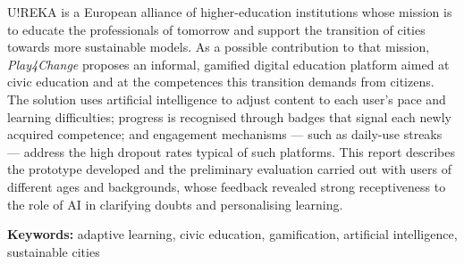 \abstractEN %

U!REKA is a European alliance of higher-education institutions whose mission is to educate the professionals of tomorrow and support the transition of cities towards more sustainable models. As a possible contribution to that mission, \emph{Play4Change} proposes an informal, gamified digital education platform aimed at civic education and at the competences this transition demands from citizens. The solution uses artificial intelligence to adjust content to each user's pace and learning difficulties; progress is recognised through badges that signal each newly acquired competence; and engagement mechanisms --- such as daily-use streaks --- address the high dropout rates typical of such platforms. This report describes the prototype developed and the preliminary evaluation carried out with users of different ages and backgrounds, whose feedback revealed strong receptiveness to the role of AI in clarifying doubts and personalising learning.

\vspace{0.5cm}
\noindent\textbf{Keywords:} adaptive learning, civic education, gamification, artificial intelligence, sustainable cities
